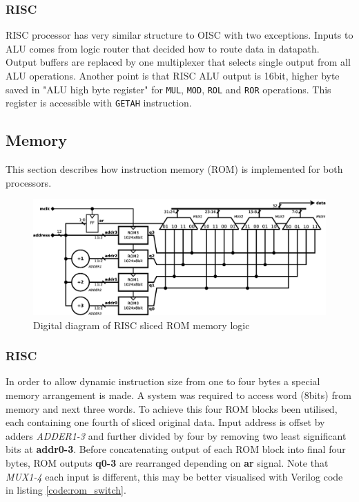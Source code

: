 \subsubsection{RISC}
RISC processor has very similar structure to OISC with two exceptions. Inputs to ALU comes from logic router that decided how to route data in datapath. Output buffers are replaced by one multiplexer that selects single output from all ALU operations. Another point is that RISC ALU output is 16bit, higher byte saved in "ALU high byte register" for \texttt{MUL}, \texttt{MOD}, \texttt{ROL} and \texttt{ROR} operations. This register is accessible with \texttt{GETAH} instruction.

\subsection{Memory}\label{subsec:memory}
This section describes how instruction memory (ROM) is implemented for both processors.

\begin{figure}[b]
	\centering
	\includegraphics[scale=0.35]{../resources/risc_mem.eps}
	\caption{Digital diagram of RISC sliced ROM memory logic}
	\label{fig:risc_mem}
\end{figure}

\subsubsection{RISC}
In order to allow dynamic instruction size from one to four bytes a special memory arrangement is made. A system was required to access word (8bits) from memory and next three words. To achieve this four ROM blocks been utilised, each containing one fourth of sliced original data. Input address is offset by adders \textit{ADDER1-3} and further divided by four by removing two least significant bits at \textbf{addr0-3}. 
Before concatenating output of each ROM block into final four bytes, ROM outputs \textbf{q0-3} are rearranged depending on \textbf{ar} signal. Note that \textit{MUX1-4} each input is different, this may be better visualised with Verilog code in listing \ref{code:rom_switch}.



